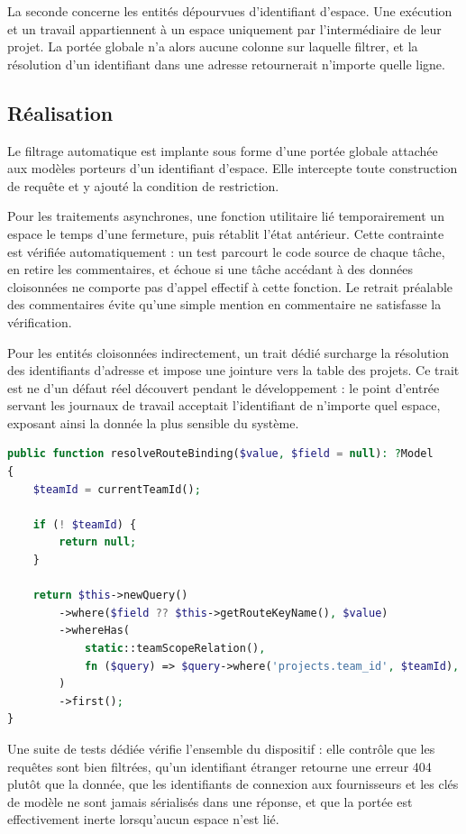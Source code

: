 \documentclass[12pt,a4paper,oneside]{report}
\begin{document}
La seconde concerne les entités dépourvues d'identifiant d'espace. Une exécution
et un travail appartiennent à un espace uniquement par l'intermédiaire de leur
projet. La portée globale n'a alors aucune colonne sur laquelle filtrer, et la
résolution d'un identifiant dans une adresse retournerait n'importe quelle ligne.

\subsection{Réalisation}

Le filtrage automatique est implante sous forme d'une portée globale attachée aux
modèles porteurs d'un identifiant d'espace. Elle intercepte toute construction de
requête et y ajouté la condition de restriction.

Pour les traitements asynchrones, une fonction utilitaire lié temporairement un
espace le temps d'une fermeture, puis rétablit l'état antérieur. Cette contrainte
est vérifiée automatiquement : un test parcourt le code source de chaque tâche,
en retire les commentaires, et échoue si une tâche accédant à des données
cloisonnées ne comporte pas d'appel effectif à cette fonction. Le retrait
préalable des commentaires évite qu'une simple mention en commentaire ne satisfasse
la vérification.

Pour les entités cloisonnées indirectement, un trait dédié surcharge la
résolution des identifiants d'adresse et impose une jointure vers la table des
projets. Ce trait est ne d'un défaut réel découvert pendant le développement : le
point d'entrée servant les journaux de travail acceptait l'identifiant de
n'importe quel espace, exposant ainsi la donnée la plus sensible du système.

\begin{lstlisting}[language=PHP,caption={Resolution d'identifiant contrainte par l'espace de travail}]
public function resolveRouteBinding($value, $field = null): ?Model
{
    $teamId = currentTeamId();

    if (! $teamId) {
        return null;
    }

    return $this->newQuery()
        ->where($field ?? $this->getRouteKeyName(), $value)
        ->whereHas(
            static::teamScopeRelation(),
            fn ($query) => $query->where('projects.team_id', $teamId),
        )
        ->first();
}
\end{lstlisting}

Une suite de tests dédiée vérifie l'ensemble du dispositif : elle contrôle que
les requêtes sont bien filtrées, qu'un identifiant étranger retourne une erreur
404 plutôt que la donnée, que les identifiants de connexion aux fournisseurs et
les clés de modèle ne sont jamais sérialisés dans une réponse, et que la portée
est effectivement inerte lorsqu'aucun espace n'est lié.
\end{document}
